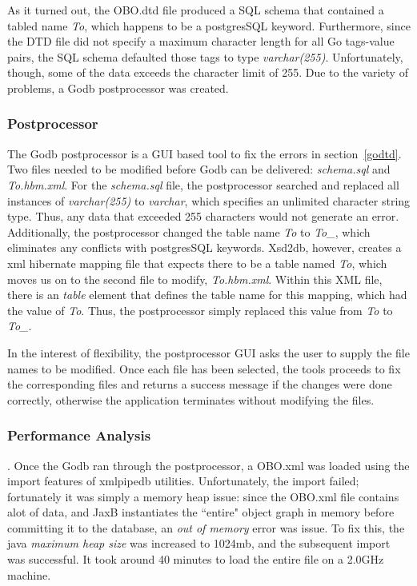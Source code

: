 As it turned out, the OBO.dtd file produced a SQL schema that contained a tabled name \emph{To}, which happens to be
a postgresSQL keyword. Furthermore, since the DTD file did not specify a maximum character length for all Go tags-value
pairs, the SQL schema defaulted those tags to type \emph{varchar(255)}. Unfortunately, though, some of the data exceeds the
character limit of 255. Due to the variety of problems, a Godb postprocessor was created.

\subsubsection{Postprocessor}
The Godb postprocessor is a GUI based tool to fix the errors in section~\ref{godtd}. Two files needed to be modified  before
Godb can be delivered: \emph{schema.sql} and \emph{To.hbm.xml}. For the \emph{schema.sql} file, the postprocessor
searched and replaced all instances of \emph{varchar(255)} to \emph{varchar}, which specifies an unlimited character string type.
Thus, any data that exceeded 255 characters would not generate an error. Additionally,
the postprocessor changed the table name \emph{To} to  \emph{To\_}, which eliminates any conflicts with postgresSQL keywords.
Xsd2db, however,
creates a xml hibernate mapping file that expects there to be a table named \emph{To}, which moves us on to the second file to modify,
\emph{To.hbm.xml}. Within this XML file, there is an \emph{table} element that defines the table name for this mapping, which had the
value of \emph{To}. Thus, the postprocessor simply replaced this value from \emph{To} to \emph{To\_}.

In the interest of flexibility, the postprocessor GUI asks the user to supply the file names to be modified.
Once each file has been selected, the tools proceeds to fix the corresponding files and returns a success message
if the changes were done correctly, otherwise the application terminates without modifying the files.

\subsubsection{Performance Analysis}.
Once the Godb ran through the postprocessor, a OBO.xml was loaded using the import features of xmlpipedb utilities.
Unfortunately, the import failed; fortunately it was simply a memory heap issue: since the OBO.xml file contains alot of data, and
JaxB instantiates the ``entire" object graph in memory before committing it to the database, an \emph{out of memory} error was issue.
To fix this, the java \emph{maximum heap size} was increased to 1024mb, and the subsequent import was successful. It took
around 40 minutes to load the entire file on a 2.0GHz machine.

